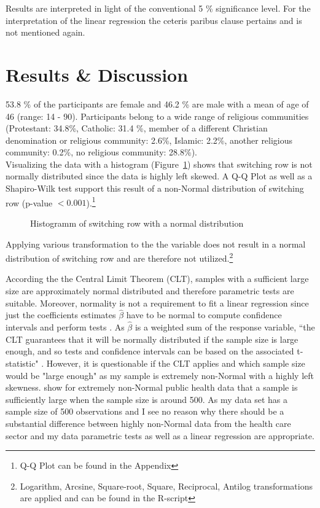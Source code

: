 \documentclass[10pt,a4paper]{article}
\begin{document}
Results are interpreted in light of the conventional 5 \% significance level. For the interpretation of the linear regression the ceteris paribus clause pertains and is not mentioned again.

\section{Results \& Discussion}

53.8 \% of the participants are female and 46.2 \% are male with a mean of age of 46 (range: 14 - 90). Participants belong to a wide range of religious communities (Protestant: 34.8\%, Catholic: 31.4 \%, member of a different Christian denomination or religious community: 2.6\%, Islamic: 2.2\%, another religious community: 0.2\%, no religious community: 28.8\%).\\
 
Visualizing the data with a histogram (Figure~\ref{fig:a}) shows that switching row is not normally distributed since the data is highly left skewed. A Q-Q Plot as well as a Shapiro-Wilk test support this result of a non-Normal distribution of switching row (p-value $< 0.001$).\footnote{Q-Q Plot can be found in the Appendix}\\

\begin{figure}[!htbp] 
\begin{center}
\scalebox{0.5}{
}
\caption{Histogramm of switching row with a normal distribution}\label{fig:a}
\end{center}
\end{figure}

Applying various transformation to the the variable does not result in a normal distribution of switching row and are therefore not utilized.\footnote{Logarithm, Arcsine, Square-root, Square, Reciprocal, Antilog transformations are applied and can be found in the R-script} 

According the the Central Limit Theorem (CLT), samples with a sufficient large size are approximately normal distributed and therefore parametric tests are suitable. Moreover, normality is not a requirement to fit a linear regression since just the coefficients estimates $\hat{\beta}$ have to be normal to compute confidence intervals and perform tests \parencite{lumley2002importance}. As $\hat{\beta}$ is a weighted sum of the response variable, “the CLT guarantees that it will be normally distributed if the sample size is large enough, and so tests and confidence intervals can be based on the associated t-statistic" \parencite{lumley2002importance}. However, it is questionable if the CLT applies and which sample size would be "large enough" as my sample is extremely non-Normal with a highly left skewness. \textcite{lumley2002importance} show for extremely non-Normal public health data that a sample is sufficiently large when the sample size is around 500. As my data set has a sample size of 500 observations and I see no reason why there should be a substantial difference between highly non-Normal data from the health care sector and my data parametric tests as well as a linear regression are appropriate.\\
\end{document}

